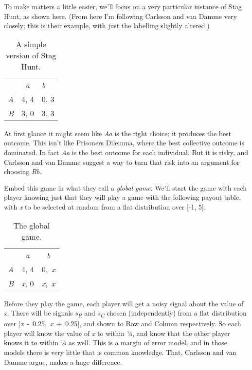 \documentclass[
  12pt,
  letterpaper,
]{scrbook}
\begin{document}
To make matters a little easier, we'll focus on a very particular
instance of Stag Hunt, as shown here. (From here I'm following Carlsson
and van Damme very closely; this is their example, with just the
labelling slightly altered.)

\begin{longtable}[]{@{}rcl@{}}
\caption{A simple version of Stag
Hunt.}\label{tbl-stag-hunt}\tabularnewline
\toprule\noalign{}
\endfirsthead
\endhead
\bottomrule\noalign{}
\endlastfoot
& \emph{a} & \emph{b} \\
\emph{A} & 4, 4 & 0, 3 \\
\emph{B} & 3, 0 & 3, 3 \\
\end{longtable}

At first glance it might seem like \emph{Aa} is the right choice; it
produces the best outcome. This isn't like Prisoners Dilemma, where the
best collective outcome is dominated. In fact \emph{Aa} is the best
outcome for each individual. But it is risky, and Carlsson and van Damme
suggest a way to turn that risk into an argument for choosing \emph{Bb}.

Embed this game in what they call a \emph{global game}. We'll start the
game with each player knowing just that they will play a game with the
following payout table, with \emph{x} to be selected at random from a
flat distribution over {[}-1, 5{]}.

\begin{longtable}[]{@{}rcc@{}}
\caption{The global game.}\label{tbl-global-game}\tabularnewline
\toprule\noalign{}
\endfirsthead
\endhead
\bottomrule\noalign{}
\endlastfoot
& \emph{a} & \emph{b} \\
\emph{A} & 4, 4 & 0,~\emph{x} \\
\emph{B} & \emph{x}, 0 & \emph{x},~\emph{x} \\
\end{longtable}

Before they play the game, each player will get a noisy signal about the
value of \emph{x}. There will be signals \emph{s\textsubscript{R}} and
\emph{s\textsubscript{C}} chosen (independently) from a flat
distribution over {[}\emph{x}~-~0.25,~\emph{x}~+~0.25{]}, and shown to
Row and Column respectively. So each player will know the value of
\emph{x} to within ¼, and know that the other player knows it to within
¼ as well. This is a margin of error model, and in those models there is
very little that is common knowledge. That, Carlsson and van Damme
argue, makes a huge difference.
\end{document}
